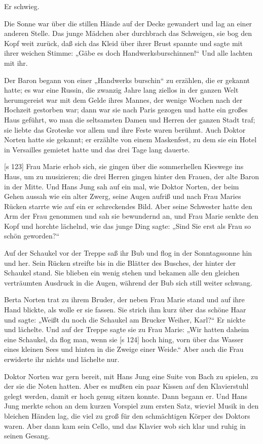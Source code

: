 Er schwieg.

Die Sonne war über die stillen Hände auf der
Decke gewandert und lag an einer anderen Stelle.
Das junge Mädchen aber durchbrach das Schweigen,
sie bog den Kopf weit zurück, daß sich das Kleid
über ihrer Brust spannte und sagte mit ihrer weichen
Stimme: „Gäbe es doch Handwerksburschinnen!“
Und alle lachten mit ihr.

Der Baron begann von einer „Handwerks­
burschin“ zu erzählen, die er gekannt hatte; es war eine
Russin, die zwanzig Jahre lang ziellos in der ganzen
Welt herumgereist war mit dem Gelde ihres Mannes,
der wenige Wochen nach der Hochzeit gestorben war;
dann war sie nach Paris gezogen und hatte ein großes
Haus geführt, wo man die seltsamsten Damen und
Herren der ganzen Stadt traf; sie liebte das Groteske
vor allem und ihre Feste waren berühmt. Auch
Doktor Norten hatte sie gekannt; er erzählte von
einem Maskenfest, zu dem sie ein Hotel in Versailles
gemietet hatte und das drei Tage lang dauerte.

[s 123]
Frau Marie erhob sich, sie gingen über die
sommerhellen Kieswege ins Haus, um zu musizieren;
die drei Herren gingen hinter den Frauen, der alte
Baron in der Mitte. Und Hans Jung sah auf ein­
mal, wie Doktor Norten, der beim Gehen aussah
wie ein alter Zwerg, seine Augen aufriß und nach
Frau Maries Rücken starrte wie auf ein er­
schreckendes Bild. Aber seine Schwester hatte den
Arm der Frau genommen und sah sie bewundernd
an, und Frau Marie senkte den Kopf und horchte
lächelnd, wie das junge Ding sagte: „Sind Sie erst
als Frau so schön geworden?“

Auf der Schaukel vor der Treppe saß ihr Bub
und flog in der Sonntagssonne hin und her. Sein
Rücken streifte bis in die Blätter des Busches, der
hinter der Schaukel stand. Sie blieben ein wenig
stehen und bekamen alle den gleichen verträumten
Ausdruck in die Augen, während der Bub sich still
weiter schwang.

Berta Norten trat zu ihrem Bruder, der neben
Frau Marie stand und auf ihre Hand blickte, als
wolle er sie fassen. Sie strich ihm kurz über das
schöne Haar und sagte: „Weißt du noch die Schaukel
am Brucker Weiher, Karl?“ Er nickte und lächelte.
Und auf der Treppe sagte sie zu Frau Marie: „Wir
hatten daheim eine Schaukel, da flog man, wenn sie
[s 124]
hoch hing, vorn über das Wasser eines kleinen Sees
und hinten in die Zweige einer Weide.“ Aber auch
die Frau erwiderte ihr nichts und lächelte nur.

Doktor Norten war gern bereit, mit Hans Jung
eine Suite von Bach zu spielen, zu der sie die Noten
hatten. Aber es mußten ein paar Kissen auf den
Klavierstuhl gelegt werden, damit er hoch genug
sitzen konnte. Dann begann er. Und Hans Jung
merkte schon an dem kurzen Vorspiel zum ersten
Satz, wieviel Musik in den bleichen Händen lag, die
viel zu groß für den schmächtigen Körper des Doktors
waren. Aber dann kam sein Cello, und das Klavier
wob sich klar und ruhig in seinen Gesang.

